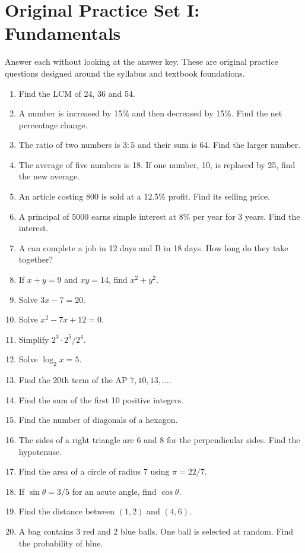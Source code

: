 \documentclass[12pt,a4paper,oneside]{book}
\begin{document}
\chapter[Practice I: Fundamentals]{Original Practice Set I: Fundamentals}
Answer each without looking at the answer key. These are original practice questions designed around the syllabus and textbook foundations.

\begin{enumerate}[label=\textbf{Q\arabic*.}, leftmargin=*]
\item Find the LCM of 24, 36 and 54.
\item A number is increased by 15\% and then decreased by 15\%. Find the net percentage change.
\item The ratio of two numbers is \(3:5\) and their sum is 64. Find the larger number.
\item The average of five numbers is 18. If one number, 10, is replaced by 25, find the new average.
\item An article costing 800 is sold at a 12.5\% profit. Find its selling price.
\item A principal of 5000 earns simple interest at 8\% per year for 3 years. Find the interest.
\item A can complete a job in 12 days and B in 18 days. How long do they take together?
\item If \(x+y=9\) and \(xy=14\), find \(x^2+y^2\).
\item Solve \(3x-7=20\).
\item Solve \(x^2-7x+12=0\).
\item Simplify \(2^3\cdot2^5/2^4\).
\item Solve \(\log_2 x=5\).
\item Find the 20th term of the AP \(7,10,13,\ldots\).
\item Find the sum of the first 10 positive integers.
\item Find the number of diagonals of a hexagon.
\item The sides of a right triangle are 6 and 8 for the perpendicular sides. Find the hypotenuse.
\item Find the area of a circle of radius 7 using \(\pi=22/7\).
\item If \(\sin\theta=3/5\) for an acute angle, find \(\cos\theta\).
\item Find the distance between \((1,2)\) and \((4,6)\).
\item A bag contains 3 red and 2 blue balls. One ball is selected at random. Find the probability of blue.
\end{enumerate}
\end{document}
